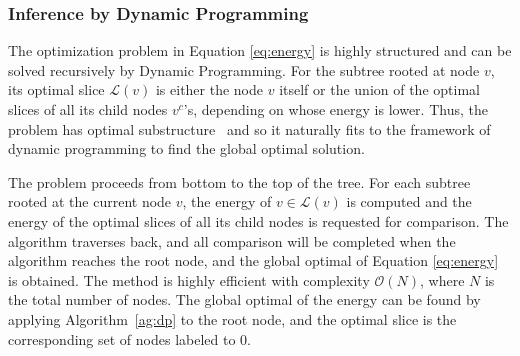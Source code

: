 

\subsubsection{Inference by Dynamic Programming}
\label{sec:dp}
The optimization problem in Equation \ref{eq:energy} is highly structured
and can be solved recursively by Dynamic Programming.
For the subtree rooted at node $v$, its optimal slice $\mathcal{L}(v)$ is either the
node $v$ itself or the union of the optimal slices of all its child
nodes $v^c$'s, depending on whose energy is lower.
Thus, the problem has optimal substructure~\cite{cormen2009introduction}
and so it naturally fits to the framework of dynamic programming to find the global optimal solution. 





The problem proceeds from bottom to the top of the tree.
For each subtree rooted at the current node $v$, the energy of $v \in
\mathcal{L}(v)$ is computed and the energy of the optimal slices of
all its child nodes is requested for comparison.
The algorithm traverses back, and all comparison will be completed when the algorithm reaches the root
node, and the global optimal of Equation \ref{eq:energy} is obtained.
The method is highly efficient with complexity $\mathcal{O}(N)$, where $N$ is the total number of nodes.
The global optimal of the energy can be found by applying Algorithm~\ref{ag:dp} to the root node,
and the optimal slice is the corresponding set of nodes labeled to $0$. 

